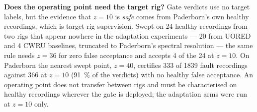 \textbf{Does the operating point need the target rig?} Gate verdicts use no target labels, but the evidence that $z = 10$ is
\emph{safe} comes from Paderborn's own healthy recordings, which is target-rig supervision. Swept on 24 healthy recordings
from two rigs that appear nowhere in the adaptation experiments --- 20 from UORED and 4 CWRU baselines, truncated to
Paderborn's spectral resolution --- the same rule needs $z = 36$ for zero false acceptance and accepts 4 of the 24 at $z = 10$.
On Paderborn the nearest swept point, $z = 40$, certifies 333 of 1839 fault recordings against 366 at $z = 10$
(\SI{91}{\percent} of the verdicts) with no healthy false acceptance. An operating point does not transfer between rigs and must be characterised on healthy recordings wherever the
gate is deployed; the adaptation arms were run at $z = 10$ only.
